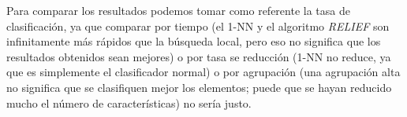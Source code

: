\documentclass[11pt,a4paper]{article}
\begin{document}
\begin{table}[H]
%
\caption{Valores medios de los tres algoritmos en el problema del APC.}
\end{table}

Para comparar los resultados podemos tomar como referente la tasa de clasificación, ya que comparar por tiempo 
(el 1-NN y el algoritmo \textit{RELIEF} son infinitamente más rápidos que la búsqueda local, pero eso no significa que los
resultados obtenidos sean mejores) o por tasa se reducción (1-NN no reduce, ya que es simplemente el clasificador normal) o
por agrupación (una agrupación alta no significa que se clasifiquen mejor los elementos; puede que se hayan reducido mucho
el número de características) no sería justo.
\end{document}
